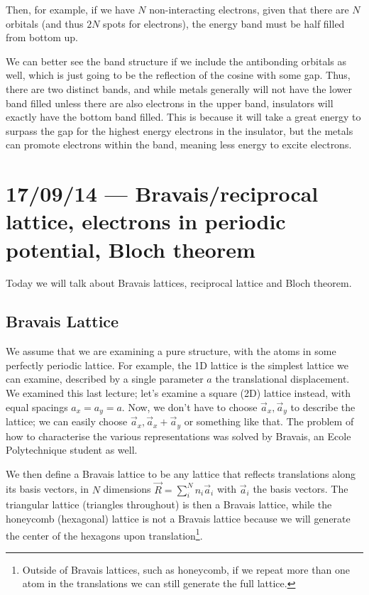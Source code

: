 \documentclass[10pt]{report}
\begin{document}
Then, for example, if we have $N$ non-interacting electrons, given that there are $N$ orbitals (and thus $2N$ spots for electrons), the energy band must be half filled from bottom up. 

We can better see the band structure if we include the antibonding orbitals as well, which is just going to be the reflection of the cosine with some gap. Thus, there are two distinct bands, and while metals generally will not have the lower band filled unless there are also electrons in the upper band, insulators will exactly have the bottom band filled. This is because it will take a great energy to surpass the gap for the highest energy electrons in the insulator, but the metals can promote electrons within the band, meaning less energy to excite electrons.

\chapter{17/09/14 --- Bravais/reciprocal lattice, electrons in periodic potential, Bloch theorem}

Today we will talk about Bravais lattices, reciprocal lattice and Bloch theorem.

\section{Bravais Lattice}

We assume that we are examining a pure structure, with the atoms in some perfectly periodic lattice. For example, the 1D lattice is the simplest lattice we can examine, described by a single parameter $a$ the translational displacement. We examined this last lecture; let's examine a square (2D) lattice instead, with equal spacings $a_x = a_y = a$. Now, we don't have to choose $\vec{a}_x, \vec{a}_y$ to describe the lattice; we can easily choose $\vec{a}_x, \vec{a}_x + \vec{a}_y$ or something like that. The problem of how to characterise the various representations was solved by Bravais, an Ecole Polytechnique student as well.

We then define a Bravais lattice to be any lattice that reflects translations along its basis vectors, in $N$ dimensions $\vec{R} = \sum\limits_{i}^{N}n_i\vec{a}_i$ with $\vec{a}_i$ the basis vectors. The triangular lattice (triangles throughout) is then a Bravais lattice, while the honeycomb (hexagonal) lattice is not a Bravais lattice because we will generate the center of the hexagons upon translation\footnote{Outside of Bravais lattices, such as honeycomb, if we repeat more than one atom in the translations we can still generate the full lattice.}.
\end{document}
